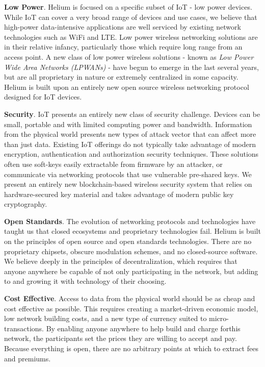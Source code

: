\documentclass[letterpaper,11pt]{article}
\begin{document}
\textbf{Low Power}. Helium is focused on a specific subset of IoT - low power devices. While IoT can cover a very broad range of devices and use cases, we believe that high-power data-intensive applications are well serviced by existing network technologies such as WiFi and LTE. Low power wireless networking solutions are in their relative infancy, particularly those which require long range from an access point. A new class of low power wireless solutions - known as \textit{Low Power Wide Area Networks (LPWANs)} - have begun to emerge in the last several years, but are all proprietary in nature or extremely centralized in some capacity. Helium is built upon an entirely new open source wireless networking protocol designed for IoT devices.\newline

\textbf{Security}. IoT presents an entirely new class of security challenge. Devices can be small, portable and with limited computing power and bandwidth. Information from the physical world presents new types of attack vector that can affect more than just data. Existing IoT offerings do not typically take advantage of modern encryption, authentication and authorization security techniques. These solutions often use soft-keys easily extractable from firmware by an attacker, or communicate via networking protocols that use vulnerable pre-shared keys. We present an entirely new blockchain-based wireless security system that relies on hardware-secured key material and takes advantage of modern public key cryptography.\newline

\textbf{Open Standards}. The evolution of networking protocols and technologies have taught us that closed ecosystems and proprietary technologies fail. Helium is built on the principles of open source and open standards technologies. There are no proprietary chipsets, obscure modulation schemes, and no closed-source software. We believe deeply in the principles of decentralization, which requires that anyone anywhere be capable of not only participating in the network, but adding to and growing it with technology of their choosing.\newline

\textbf{Cost Effective}. Access to data from the physical world should be as cheap and cost effective as possible. This requires creating a market-driven economic model, low network building costs, and a new type of currency suited to micro-transactions. By enabling anyone anywhere to help build and charge forthis network, the participants set the prices they are willing to accept and pay. Because everything is open, there are no arbitrary points at which to extract fees and premiums. \newline
\end{document}
